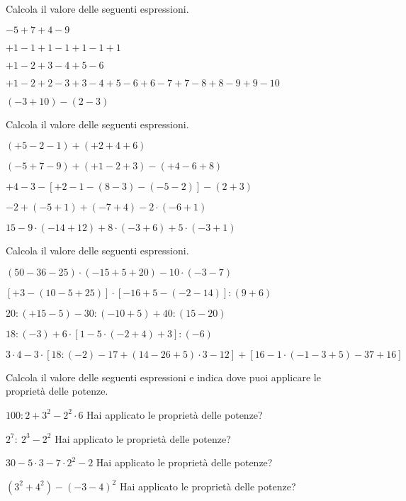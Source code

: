 \begin{esercizio}[\Ast]
Calcola il valore delle seguenti espressioni.
 \begin{enumeratea}
 \item $-5+7+4-9$
 \item $+1-1+1-1+1-1+1$
 \item $+1-2+3-4+5-6$
 \item $+1-2+2-3+3-4+5-6+6-7+7-8+8-9+9-10$
 \item $(-3+10)-(2-3)$
 \end{enumeratea}
\end{esercizio}

\begin{esercizio}[\Ast]
Calcola il valore delle seguenti espressioni.
 \begin{enumeratea}
 \item $(+5-2-1)+(+2+4+6)$
 \item $(-5+7-9)+(+1-2+3)-(+4-6+8)$
 \item $+4-3-[+2-1-(8-3)-(-5-2)]-(2+3)$
 \item $-2+(-5+1)+(-7+4)-2 \cdot (-6+1)$
 \item $15-9 \cdot (-14+12)+8 \cdot (-3+6)+ 5 \cdot(-3+1)$
 \end{enumeratea}
\end{esercizio}

\begin{esercizio}[\Ast]
Calcola il valore delle seguenti espressioni.
 \begin{enumeratea}
 \item $(50-36-25)\cdot (-15+5+20)-10\cdot (-3-7)$
 \item $[+3-(10-5+25)]\cdot [-16+5-(-2-14)]:(9+6)$
 \item $20:(+15-5)-30:(-10+5)+40:(15-20)$
 \item $18:(-3)+6\cdot [1-5\cdot (-2+4)+3]: (-6)$
 \item $3\cdot 4-3\cdot [18:(-2)-17+(14-26+5)\cdot 3-12]+[16-1\cdot 
(-1-3+5)-37+16]$
\end{enumeratea}
\end{esercizio}

\begin{esercizio}[\Ast]
Calcola il valore delle seguenti espressioni e indica dove puoi applicare le 
proprietà delle potenze.
\TabPositions{3.5cm}
\begin{enumeratea}
 \item $100:2+3^2 -2^2\cdot 6$ \tab Hai applicato le proprietà delle 
potenze?\enspace\dotfill
 \item $2^7:~2^3 -2^2$ \tab Hai applicato le proprietà delle 
potenze?\enspace\dotfill
 \item $30-5\cdot 3 -7\cdot 2^2 -2$ \tab Hai applicato le proprietà delle 
potenze?\enspace\dotfill
 \item $(3^2 +4^2) -(-3-4)^2$ \tab Hai applicato le proprietà delle 
potenze?\enspace\dotfill
\end{enumeratea}
\end{esercizio}

